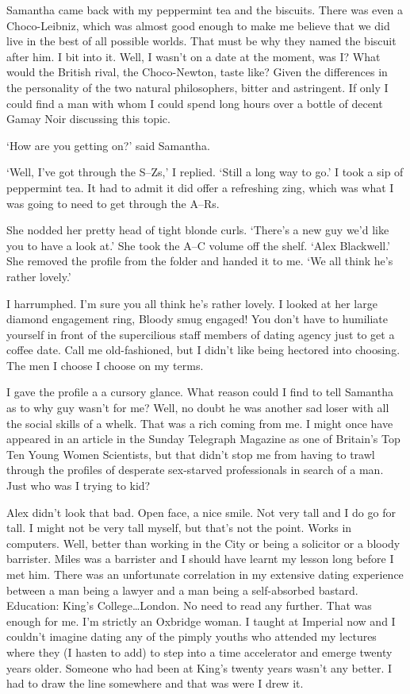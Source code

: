 Samantha came back with my peppermint tea and the biscuits. There
was even a Choco-Leibniz, which was almost good enough to make me
believe that we did live in the best of all possible worlds. That
must be why they named the biscuit after him. I bit into it. Well, I
wasn't on a date at the moment, was I? What would the British rival,
the Choco-Newton, taste like? Given the differences in the
personality of the two natural philosophers, bitter and astringent.
If only I could find a man with whom I could spend long hours over a
bottle of decent Gamay Noir discussing this topic.

`How are you getting on?' said Samantha.

`Well, I've got through the S--Zs,' I replied.  `Still a long way to
go.' I took a sip of peppermint tea. It had to admit it did offer a
refreshing zing, which was what I was going to need to get through
the A--Rs.

She nodded her pretty head of tight blonde curls. `There's a new guy
we'd like you to have a look at.' She took the A--C volume off the
shelf. `Alex Blackwell.' She removed the profile from the folder and
handed it to me. `We all think he's rather lovely.'

I harrumphed. I'm sure you all think he's rather lovely. I looked at
her large diamond engagement ring, Bloody smug engaged! You don't
have to humiliate yourself in front of the supercilious staff
members of dating agency just to get a coffee date. Call me
old-fashioned, but I didn't like being hectored into choosing. The men I choose I choose on my terms.

I gave the profile a a cursory glance. What reason could I find to
tell Samantha as to why guy wasn't for me? Well, no doubt he was
another sad loser with all the social skills of a whelk. That was a
rich coming from me. I might once have appeared in an article in the
{\twelvesl Sunday Telegraph Magazine\/} as one of Britain's Top Ten
Young Women Scientists, but that didn't stop me from having to trawl
through the profiles of desperate sex-starved professionals in
search of a man. Just who was I trying to kid?

Alex didn't look that bad. Open face, a nice smile. Not very tall
and I do go for tall. I might not be very tall myself, but that's
not the point. Works in computers. Well, better than working in the
City or being a solicitor or a bloody barrister. Miles was a
barrister and I should have learnt my lesson long before I met him.
There was an unfortunate correlation in my extensive dating
experience between a man being a lawyer and a man being a
self-absorbed bastard. Education: King's College\dots London. No
need to read any further. That was enough for me. I'm strictly an
Oxbridge woman. I taught at Imperial now and I couldn't imagine
dating any of the pimply youths who attended my lectures where they
(I hasten to add) to step into a time accelerator and emerge twenty
years older. Someone who had been at King's twenty years wasn't any
better. I had to draw the line somewhere and that was were I drew
it.

